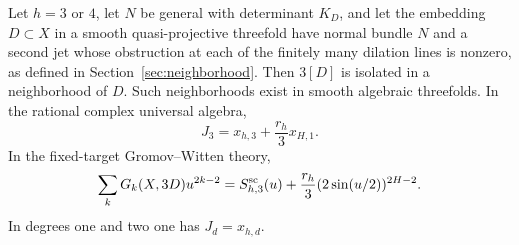 \begin{theorem}\label{thm:isolated}
Let $h=3$ or $4$, let $N$ be general with determinant $K_D$, and let
the embedding $D\subset X$ in a smooth quasi-projective threefold
have normal bundle $N$ and a second jet whose obstruction at each of the finitely many dilation lines is nonzero, as defined in Section~\ref{sec:neighborhood}. Then $3[D]$ is isolated in a neighborhood of $D$. Such
neighborhoods exist in smooth algebraic threefolds. In the rational
complex universal algebra,
\begin{equation}\label{eq:main-class}
           J_3=x_{h,3}+\frac{r_h}{3}x_{H,1}.
\end{equation}
In the fixed-target Gromov--Witten theory,
\begin{equation}\label{eq:main-gw}
   \sum_k G_k(X,3D)u^{2k-2}
      =S^{\rm sc}_{h,3}(u)+\frac{r_h}{3}(2\sin(u/2))^{2H-2}.
\end{equation}
In degrees one and two one has $J_d=x_{h,d}$.
\end{theorem}

